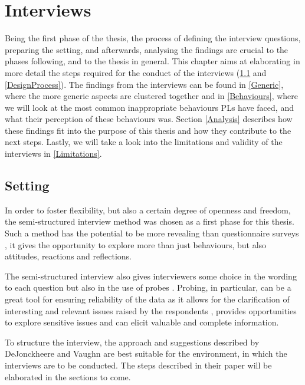 \chapter{Interviews}

Being the first phase of the thesis, the process of defining the interview questions, preparing the setting, and afterwards, analysing the findings are crucial to the phases following, and to the thesis in general. This chapter aims at elaborating in more detail the steps required for the conduct of the interviews (\ref{Setting} and \ref{DesignProcess}). The findings from the interviews can be found in \ref{Generic}, where the more generic aspects are clustered together and in \ref{Behaviours}, where we will look at the most common inappropriate behaviours PLs have faced, and what their perception of these behaviours was. Section \ref{Analysis} describes how these findings fit into the purpose of this thesis and how they contribute to the next steps. Lastly, we will take a look into the limitations and validity of the interviews in \ref{Limitations}.

\section{Setting}\label{Setting}

In order to foster flexibility, but also a certain degree of openness and freedom, the semi-structured interview method was chosen as a first phase for this thesis. Such a method has the potential to be more revealing than questionnaire surveys \cite{Barriball1994}, it gives the opportunity to explore more than just behaviours, but also attitudes, reactions and reflections. 

The semi-structured interview also gives interviewers some choice in the wording to each question but also in the use of probes \cite{Hutchinson1992}. Probing, in particular, can be a great tool for ensuring reliability of the data as it allows for the clarification of interesting and relevant issues raised by the respondents  \cite{Hutchinson1992}, provides opportunities to explore sensitive issues \cite{NayBrock1984} and can elicit valuable and complete information.

To structure the interview, the approach and suggestions described by DeJonckheere and Vaughn \cite{Dejonckheere2019} are best suitable for the environment, in which the interviews are to be conducted. The steps described in their paper will be elaborated in the sections to come.

